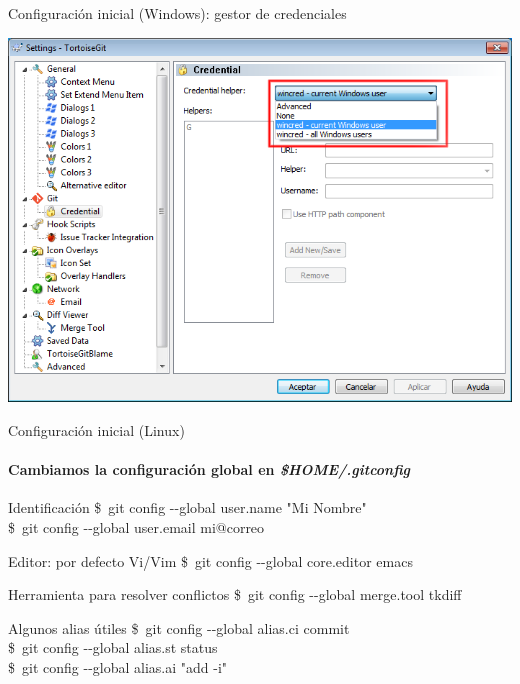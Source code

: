 \documentclass[xcolor=svgnames]{beamer}
\newcommand*{\fichero}[1]{\textit{#1}}
\newcommand*{\orden}[1]{{\scriptsize\ttfamily\$~\nohyphens{#1}\\}}
\begin{document}
\begin{frame}{Configuración inicial (Windows): gestor de credenciales}
  \begin{center}
    \includegraphics[width=\textwidth,height=.8\textheight,keepaspectratio]{tomas/configinicial-02-creds}
  \end{center}
\end{frame}

\begin{frame}{Configuración inicial (Linux)}
  \framesubtitle{Cambiamos la configuración global en \fichero{\$HOME/.gitconfig}}

  \begin{block}{Identificación}
    \orden{git config {-}-global user.name "Mi Nombre"}
    \orden{git config {-}-global user.email mi@correo}
  \end{block}

  \begin{block}{Editor: por defecto Vi/Vim}
    \orden{git config {-}-global core.editor emacs}
  \end{block}

  \begin{block}{Herramienta para resolver conflictos}
    \orden{git config {-}-global merge.tool tkdiff}
  \end{block}

  \begin{block}{Algunos alias útiles}
    \orden{git config {-}-global alias.ci commit}
    \orden{git config {-}-global alias.st status}
    \orden{git config {-}-global alias.ai "add -i"}
  \end{block}

\end{frame}
\end{document}
